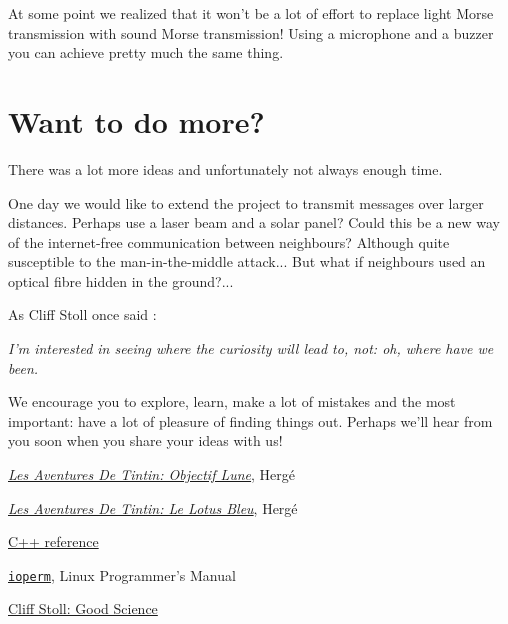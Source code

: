\documentclass[12pt]{report}
\begin{document}
At some point we realized that it won't be a lot of effort to replace light Morse transmission with sound Morse transmission! Using a microphone and a buzzer you can achieve pretty much the same thing.

\section{Want to do more?}

There was a lot more ideas and unfortunately not always enough time.

One day we would like to extend the project to transmit messages over larger distances. Perhaps use a laser beam and a solar panel? Could this be a new way of the internet-free communication between neighbours? Although quite susceptible to the man-in-the-middle attack... But what if neighbours used an optical fibre hidden in the ground?...

As Cliff Stoll once said \cite{cliff_stoll}: 

\textit{I'm interested in seeing where the curiosity will lead to, not: oh, where have we been.}

We encourage you to explore, learn, make a lot of mistakes and the most important: have a lot of pleasure of finding things out. Perhaps we'll hear from you soon when you share your ideas with us!

\newpage

\begin{thebibliography}{50}

 \hyperlink{https://fr.wikipedia.org/wiki/Objectif_Lune}{\textit{Les Aventures De Tintin: Objectif Lune}}, Hergé

 \hyperlink{https://fr.wikipedia.org/wiki/Le_Lotus_bleu}{\textit{Les Aventures De Tintin: Le Lotus Bleu}}, Hergé

 \hyperlink{http://www.cplusplus.com/reference/}{C++ reference}

 \hyperlink{http://man7.org/linux/man-pages/man2/ioperm.2.html}{\texttt{ioperm}}, Linux Programmer's Manual

 \hyperlink{https://www.youtube.com/watch?v=xHEIOgONq6A}{Cliff Stoll: Good Science}



\end{thebibliography}
\end{document}
